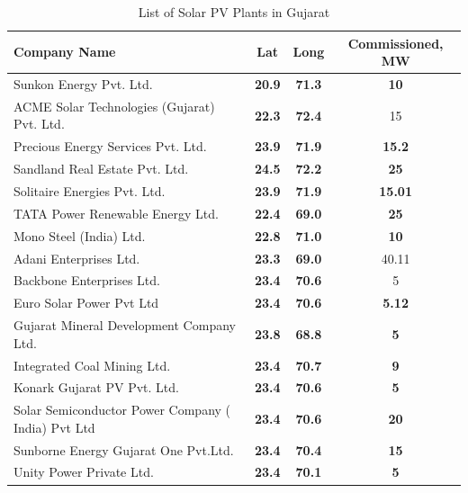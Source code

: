 \begin{table}[H]
  \centering
   \caption{List of Solar PV Plants in Gujarat}

    \begin{tabular}{|l|c|c|c|}
    \hline
    \textbf{Company Name} & \textbf{Lat } & \textbf{Long } & \textbf{Commissioned, MW} \bigstrut\\
    \hline
    Sunkon Energy Pvt. Ltd. & \textbf{20.9} & \textbf{71.3} & \textbf{10} \bigstrut\\
    \hline
    ACME Solar Technologies (Gujarat) Pvt. Ltd. & \textbf{22.3} & \textbf{72.4} & 15 \bigstrut\\
    \hline
    Precious Energy Services Pvt. Ltd. & \textbf{23.9} & \textbf{71.9} & \textbf{15.2} \bigstrut\\
    \hline
    Sandland Real Estate Pvt. Ltd. & \textbf{24.5} & \textbf{72.2} & \textbf{25} \bigstrut\\
    \hline
    Solitaire Energies Pvt. Ltd. & \textbf{23.9} & \textbf{71.9} & \textbf{15.01} \bigstrut\\
    \hline
    TATA Power Renewable Energy Ltd. & \textbf{22.4} & \textbf{69.0} & \textbf{25} \bigstrut\\
    \hline
    Mono Steel (India) Ltd. & \textbf{22.8} & \textbf{71.0} & \textbf{10} \bigstrut\\
    \hline
    Adani Enterprises Ltd. & \textbf{23.3} & \textbf{69.0} & 40.11 \bigstrut\\
    \hline
    Backbone Enterprises Ltd. & \textbf{23.4} & \textbf{70.6} & 5 \bigstrut\\
    \hline
    Euro Solar Power Pvt Ltd & \textbf{23.4} & \textbf{70.6} & \textbf{5.12} \bigstrut\\
    \hline
    Gujarat Mineral Development Company Ltd. & \textbf{23.8} & \textbf{68.8} & \textbf{5} \bigstrut\\
    \hline
    Integrated Coal Mining Ltd. & \textbf{23.4} & \textbf{70.7} & \textbf{9} \bigstrut\\
    \hline
    Konark Gujarat PV Pvt. Ltd. & \textbf{23.4} & \textbf{70.6} & \textbf{5} \bigstrut\\
    \hline
    Solar Semiconductor Power Company ( India) Pvt Ltd & \textbf{23.4} & \textbf{70.6} & \textbf{20} \bigstrut\\
    \hline
    Sunborne Energy Gujarat One Pvt.Ltd. & \textbf{23.4} & \textbf{70.4} & \textbf{15} \bigstrut\\
    \hline
    Unity Power Private Ltd.  & \textbf{23.4} & \textbf{70.1} & \textbf{5} \bigstrut\\

\end{tabular}
\end{table}
